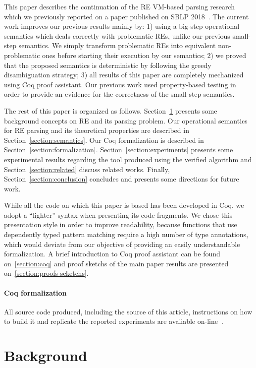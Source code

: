 \documentclass[review]{elsarticle}
\theoremstyle{definition}
\begin{document}
This paper describes the continuation of the RE VM-based parsing research which we previously reported 
on a paper published on SBLP 2018~\cite{Delfino18}. The current work improves our previous results
mainly by: 1) using a big-step operational semantics which deals correctly with problematic REs, unlike
our previous small-step semantics. We simply transform problematic REs into
equivalent non-problematic ones before starting their execution by our semantics;
2) we proved that the proposed semantics is deterministic by following the
greedy disambiguation strategy; 3) all results of this paper are completely mechanized using Coq
proof assistant. Our previous work used property-based testing in order to provide an evidence for 
the correctness of the small-step semantics.    

The rest of this paper is organized as follows.
Section~\ref{section:background} presents some 
background concepts on RE and its parsing problem. 
Our operational semantics for RE parsing and its theoretical properties
are described in Section~\ref{section:semantics}. Our Coq formalization is described in 
Section~\ref{section:formalization}.  Section~\ref{section:experiments} presents some experimental
results regarding the tool produced using the verified algorithm and Section~\ref{section:related} discuss
related works. Finally, Section~\ref{section:conclusion} concludes and 
presents some directions for future work.

While all the code on which this paper is based has been developed in Coq,
we adopt a ``lighter'' syntax when presenting its code fragments. 
We chose this presentation style in order to improve readability, because
 functions that use dependently typed pattern matching require a high number of type
 annotations, which would deviate from our objective of providing an easily
 understandable formalization. A brief introduction to Coq proof assistant can be
 found on~\ref{section:coq} and proof sketchs of the main paper results
 are presented on~\ref{section:proofs-scketchs}.

\paragraph{Coq formalization} All source code produced, including the source of this article, 
instructions on how to build it and replicate the reported experiments are avaliable 
on-line~\cite{regexvm-rep}.

\section{Background}\label{section:background}
\end{document}
